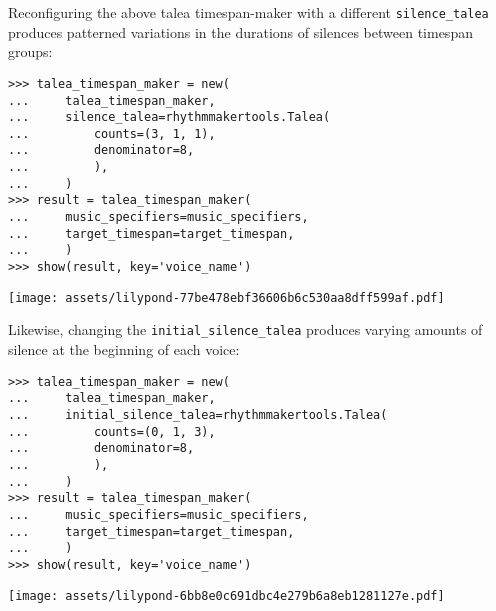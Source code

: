 \noindent Reconfiguring the above talea timespan-maker with a different
\texttt{silence\_talea} produces patterned variations in the durations of
silences between timespan groups:

\begin{comment}
<abjad>
talea_timespan_maker = new(
    talea_timespan_maker,
    silence_talea=rhythmmakertools.Talea(
        counts=(3, 1, 1),
        denominator=8,
        ),
    )
result = talea_timespan_maker(
    music_specifiers=music_specifiers,
    target_timespan=target_timespan,
    )
show(result, key='voice_name')
</abjad>
\end{comment}

\begin{abjadbookoutput}
\begin{singlespacing}
\vspace{-0.5\baselineskip}
\begin{lstlisting}
>>> talea_timespan_maker = new(
...     talea_timespan_maker,
...     silence_talea=rhythmmakertools.Talea(
...         counts=(3, 1, 1),
...         denominator=8,
...         ),
...     )
>>> result = talea_timespan_maker(
...     music_specifiers=music_specifiers,
...     target_timespan=target_timespan,
...     )
>>> show(result, key='voice_name')
\end{lstlisting}
\noindent\texttt{[image: assets/lilypond-77be478ebf36606b6c530aa8dff599af.pdf]}
\end{singlespacing}
\end{abjadbookoutput}

\noindent Likewise, changing the \texttt{initial\_silence\_talea} produces
varying amounts of silence at the beginning of each voice:

\begin{comment}
<abjad>
talea_timespan_maker = new(
    talea_timespan_maker,
    initial_silence_talea=rhythmmakertools.Talea(
        counts=(0, 1, 3),
        denominator=8,
        ),
    )
result = talea_timespan_maker(
    music_specifiers=music_specifiers,
    target_timespan=target_timespan,
    )
show(result, key='voice_name')
</abjad>
\end{comment}

\begin{abjadbookoutput}
\begin{singlespacing}
\vspace{-0.5\baselineskip}
\begin{lstlisting}
>>> talea_timespan_maker = new(
...     talea_timespan_maker,
...     initial_silence_talea=rhythmmakertools.Talea(
...         counts=(0, 1, 3),
...         denominator=8,
...         ),
...     )
>>> result = talea_timespan_maker(
...     music_specifiers=music_specifiers,
...     target_timespan=target_timespan,
...     )
>>> show(result, key='voice_name')
\end{lstlisting}
\noindent\texttt{[image: assets/lilypond-6bb8e0c691dbc4e279b6a8eb1281127e.pdf]}
\end{singlespacing}
\end{abjadbookoutput}

